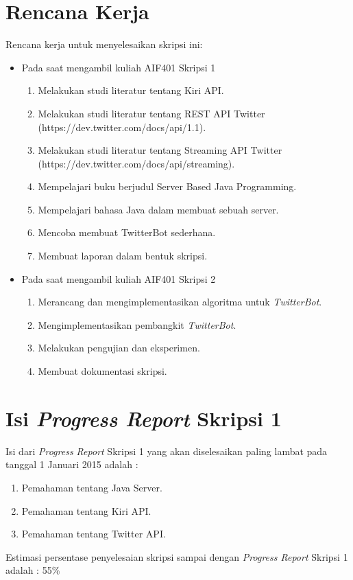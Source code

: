 \documentclass[a4paper,twoside]{article}
\begin{document}
\section{Rencana Kerja}
Rencana kerja untuk menyelesaikan skripsi ini:
\begin{itemize}
	\item Pada saat mengambil kuliah AIF401 Skripsi 1
	\begin{enumerate}
		\item Melakukan studi literatur tentang Kiri API.
		\item Melakukan studi literatur tentang REST API Twitter (https://dev.twitter.com/docs/api/1.1).
		\item Melakukan studi literatur tentang Streaming API Twitter (https://dev.twitter.com/docs/api/streaming).
		\item Mempelajari buku berjudul Server Based Java Programming.
		\item Mempelajari bahasa Java dalam membuat sebuah server.
		\item Mencoba membuat TwitterBot sederhana.
		\item Membuat laporan dalam bentuk skripsi.
	\end{enumerate}
	\item Pada saat mengambil kuliah AIF401 Skripsi 2
	\begin{enumerate}
		\item Merancang dan mengimplementasikan algoritma untuk \textit{TwitterBot}.
		\item Mengimplementasikan pembangkit \textit{TwitterBot}. 
		\item Melakukan pengujian dan eksperimen.
		\item Membuat dokumentasi skripsi.
	\end{enumerate}
\end{itemize}

\section{Isi {\it Progress Report} Skripsi 1}
Isi dari {\it Progress Report} Skripsi 1 yang akan diselesaikan paling lambat pada tanggal 1 Januari 2015 adalah :
\begin{enumerate}
	\item Pemahaman tentang Java Server.
	\item Pemahaman tentang Kiri API.
	\item Pemahaman tentang Twitter API.
\end{enumerate}
Estimasi persentase penyelesaian skripsi sampai dengan {\it Progress Report} Skripsi 1 adalah : 55\%
\vspace{1.5cm}
\end{document}
